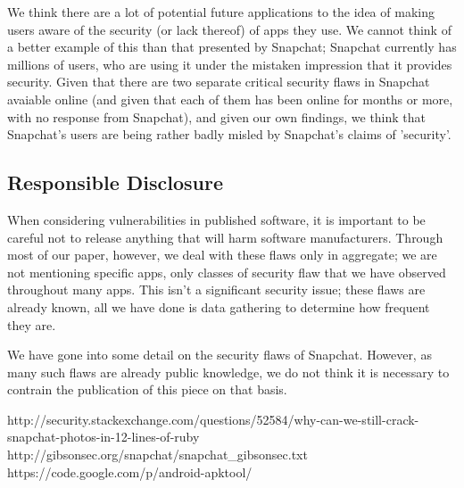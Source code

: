 \documentclass[11pt]{article}
\numberwithin{theorem}{subsection}
\begin{document}
We think there are a lot of potential future applications to the idea of making users aware of the security (or lack thereof) of apps they use.  We
cannot think of a better example of this than that presented by Snapchat; Snapchat currently has millions of users, who are using it under the
mistaken impression that it provides security.  Given that there are two separate critical security flaws in Snapchat avaiable online (and given that
each of them has been online for months or more, with no response from Snapchat), and given our own findings, we think that Snapchat's users are being
rather badly misled by Snapchat's claims of 'security'.

\subsection{Responsible Disclosure}

When considering vulnerabilities in published software, it is important to be careful not to release anything that will harm software manufacturers.
Through most of our paper, however, we deal with these flaws only in aggregate; we are not mentioning specific apps, only classes of security
flaw that we have observed throughout many apps.  This isn't a significant security issue; these flaws are already known, all we have done is
data gathering to determine how frequent they are.

We have gone into some detail on the security flaws of Snapchat.  However, as many such flaws are already public knowledge\cite{1}\cite{2}, we do
not think it is necessary to contrain the publication of this piece on that basis.

\begin{thebibliography}{9}

        http://security.stackexchange.com/questions/52584/why-can-we-still-crack-snapchat-photos-in-12-lines-of-ruby
        http://gibsonsec.org/snapchat/snapchat_gibsonsec.txt
        https://code.google.com/p/android-apktool/

\end{thebibliography}
\end{document}
